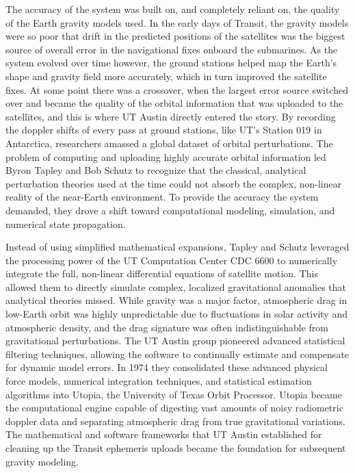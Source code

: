 The accuracy of the system was built on, and completely reliant on, the quality of the Earth gravity models used. In the early days of Transit, the gravity models were so poor that drift in the predicted positions of the satellites was the biggest source of overall error in the navigational fixes onboard the submarines. As the system evolved over time however, the ground stations helped map the Earth's shape and gravity field more accurately, which in turn improved the satellite fixes. At some point there was a crossover, when the largest error source switched over and became the quality of the orbital information that was uploaded to the satellites, and this is where UT Austin directly entered the story. By recording the doppler shifts of every pass at ground stations, like UT’s Station 019 in Antarctica, researchers amassed a global dataset of orbital perturbations. The problem of computing and uploading highly accurate orbital information led Byron Tapley and Bob Schutz to recognize that the classical, analytical perturbation theories used at the time could not absorb the complex, non-linear reality of the near-Earth environment. To provide the accuracy the system demanded, they drove a shift toward computational modeling, simulation, and  numerical state propagation. \cite{tapleyStatisticalOrbitDetermination2004}
 
Instead of using simplified mathematical expansions, Tapley and Schutz leveraged the processing power of the UT Computation Center CDC 6600 to numerically integrate the full, non-linear differential equations of satellite motion. This allowed them to directly simulate complex, localized gravitational anomalies that analytical theories missed. While gravity was a major factor, atmospheric drag in low-Earth orbit was highly unpredictable due to fluctuations in solar activity and atmospheric density, and the drag signature was often indistinguishable from gravitational perturbations. The UT Austin group pioneered advanced statistical filtering techniques, allowing the software to continually estimate and compensate for dynamic model errors. In 1974 they consolidated these advanced physical force models, numerical integration techniques, and statistical estimation algorithms into Utopia, the University of Texas Orbit Processor. Utopia became the computational engine capable of digesting vast amounts of noisy radiometric doppler data and separating atmospheric drag from true gravitational variations. The mathematical and software frameworks that UT Austin established for cleaning up the Transit ephemeris uploads became the foundation for subsequent gravity modeling.

